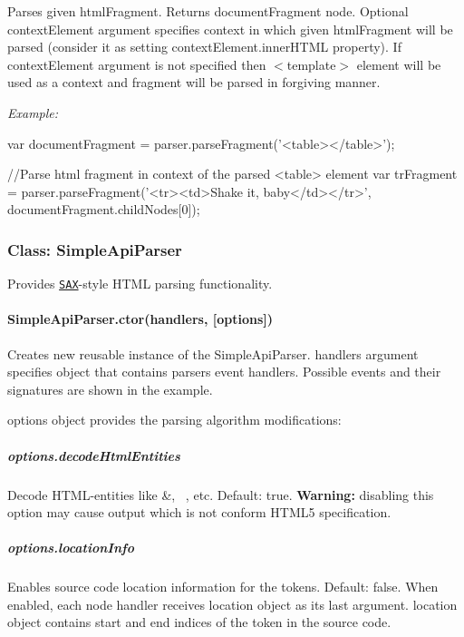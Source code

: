 Parses given {\ttfamily html\+Fragment}. Returns {\ttfamily document\+Fragment} node. Optional {\ttfamily context\+Element} argument specifies context in which given {\ttfamily html\+Fragment} will be parsed (consider it as setting {\ttfamily context\+Element.\+inner\+H\+T\+ML} property). If {\ttfamily context\+Element} argument is not specified then {\ttfamily $<$template$>$} element will be used as a context and fragment will be parsed in \textquotesingle{}forgiving\textquotesingle{} manner.

{\itshape Example\+:} 
\begin{DoxyCode}
var documentFragment = parser.parseFragment('<table></table>');

//Parse html fragment in context of the parsed <table> element
var trFragment = parser.parseFragment('<tr><td>Shake it, baby</td></tr>', documentFragment.childNodes[0]);
\end{DoxyCode}
 



\subsubsection*{Class\+: Simple\+Api\+Parser}

Provides \href{https://en.wikipedia.org/wiki/Simple_API_for_XML}{\tt S\+AX}-\/style H\+T\+ML parsing functionality.

\paragraph*{\textbullet{} Simple\+Api\+Parser.\+ctor(handlers, \mbox{[}options\mbox{]})}

Creates new reusable instance of the {\ttfamily Simple\+Api\+Parser}. {\ttfamily handlers} argument specifies object that contains parser\textquotesingle{}s event handlers. Possible events and their signatures are shown in the example.

{\ttfamily options} object provides the parsing algorithm modifications\+: \subparagraph*{options.\+decode\+Html\+Entities}

Decode H\+T\+M\+L-\/entities like {\ttfamily \&}, {\ttfamily ~}, etc. Default\+: {\ttfamily true}. {\bfseries Warning\+:} disabling this option may cause output which is not conform H\+T\+M\+L5 specification. \subparagraph*{options.\+location\+Info}

Enables source code location information for the tokens. Default\+: {\ttfamily false}. When enabled, each node handler receives {\ttfamily location} object as it\textquotesingle{}s last argument. {\ttfamily location} object contains {\ttfamily start} and {\ttfamily end} indices of the token in the source code.

